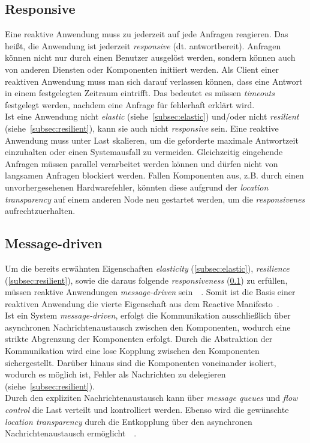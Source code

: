 \subsection{Responsive}\label{subsec:responsive}
Eine reaktive Anwendung muss zu jederzeit auf jede Anfragen reagieren. Das heißt, die Anwendung ist jederzeit \textit{responsive} (dt. antwortbereit). Anfragen können nicht nur durch einen Benutzer ausgelöst werden, sondern können auch von anderen Diensten oder Komponenten initiiert werden. Als Client einer reaktiven Anwendung muss man sich darauf verlassen können, dass eine Antwort in einem festgelegten Zeitraum eintrifft. Das bedeutet es müssen \textit{timeouts} festgelegt werden, nachdem eine Anfrage für fehlerhaft erklärt wird.\\
Ist eine Anwendung nicht \textit{elastic} (siehe~\ref{subsec:elastic}) und/oder nicht \textit{resilient} (siehe~\ref{subsec:resilient}), kann sie auch nicht \textit{responsive} sein. Eine reaktive Anwendung muss unter Last skalieren, um die geforderte maximale Antwortzeit einzuhalten oder einen Systemausfall zu vermeiden. Gleichzeitig eingehende Anfragen müssen parallel verarbeitet werden können und dürfen nicht von langsamen Anfragen blockiert werden. Fallen Komponenten aus, z.B. durch einen unvorhergesehenen Hardwarefehler, könnten diese aufgrund der \textit{location transparency} auf einem anderen Node neu gestartet werden, um die \textit{responsivenes} aufrechtzuerhalten.

\pagebreak

\subsection{Message-driven}\label{subsec:messagedriven}
Um die bereits erwähnten Eigenschaften \textit{elasticity} (\ref{subsec:elastic}), \textit{resilience} (\ref{subsec:resilient}), sowie die daraus folgende \textit{responsiveness} (\ref{subsec:responsive}) zu erfüllen, müssen reaktive Anwendungen \textit{message-driven} sein~\cite{webber_what_2014}~\cite[S.~43]{kuhn_reactive_2015}. Somit ist die Basis einer reaktiven Anwendung die vierte Eigenschaft aus dem Reactive Manifesto~\cite{boner_reactive_2014}.\\
Ist ein System \textit{message-driven}, erfolgt die Kommunikation ausschließlich über asynchronen Nachrichtenaustausch zwischen den Komponenten, wodurch eine strikte Abgrenzung der Komponenten erfolgt. Durch die Abstraktion der Kommunikation wird eine lose Kopplung zwischen den Komponenten sichergestellt. Darüber hinaus sind die Komponenten voneinander isoliert, wodurch es möglich ist, Fehler als Nachrichten zu delegieren (siehe~\ref{subsec:resilient}).\\
Durch den expliziten Nachrichtenaustausch kann über \textit{message queues} und \textit{flow control} die Last verteilt und kontrolliert werden. Ebenso wird die gewünschte \textit{location transparency} durch die Entkopplung über den asynchronen Nachrichtenaustausch ermöglicht~\cite{boner_reactive_2015}~\cite[S.~43]{kuhn_reactive_2015}.\\


